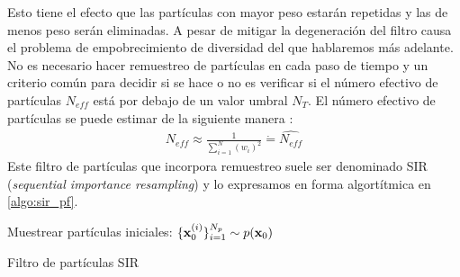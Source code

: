 Esto tiene el efecto que las partículas con mayor peso estarán repetidas y las de menos peso serán eliminadas. A pesar de mitigar la degeneración del filtro causa el problema de empobrecimiento de diversidad del que hablaremos más adelante. No es necesario hacer remuestreo de partículas en cada paso de tiempo y un criterio común para decidir si se hace o no es verificar si el número efectivo de partículas $N_{eff}$ está por debajo de un valor umbral $N_T$. El número efectivo de partículas se puede estimar de la siguiente manera \cite{Arulampalam2002}:
\begin{align*}
    N_{eff} \approx \frac{1}{\sum_{i=1}^N (w_i)^2} \dot{=} \widehat{N_{eff}}
\end{align*}
Este filtro de partículas que incorpora remuestreo suele ser denominado SIR (\textit{sequential importance resampling}) y lo expresamos en forma algortítmica en \ref{algo:sir_pf}.


\begin{algorithm}[H]\label{algo:sir_pf}    
    Muestrear partículas iniciales: $\{\mathbf{x}_0^{(i)}\}_{i=1}^{N_p} \sim p(\mathbf{x}_0)$
    
\caption{Filtro de partículas SIR}
\end{algorithm}

